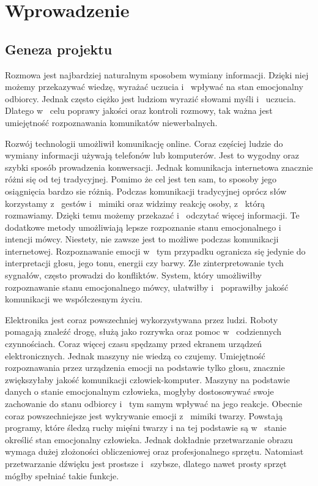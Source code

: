 \documentclass[declaration,shortabstract]{iithesis}
\author         {Elżbieta Plaszczyk}
\begin{document}
\let\cleardoublepage\clearpage
\chapter{Wprowadzenie}
\section{Geneza projektu}
Rozmowa jest najbardziej naturalnym sposobem wymiany informacji. Dzięki niej możemy przekazywać wiedzę, wyrażać uczucia i~ wpływać na stan emocjonalny odbiorcy.  Jednak często ciężko jest ludziom wyrazić słowami myśli i~ uczucia. Dlatego w~ celu poprawy jakości oraz kontroli rozmowy, tak ważna jest umiejętność rozpoznawania komunikatów niewerbalnych. 

Rozwój technologii umożliwił komunikację online. Coraz częściej ludzie do wymiany informacji używają telefonów lub komputerów. Jest to wygodny oraz szybki sposób prowadzenia konwersacji. Jednak komunikacja internetowa znacznie różni się od tej tradycyjnej. Pomimo że cel jest ten sam, to sposoby jego osiągnięcia bardzo sie różnią. Podczas komunikacji tradycyjnej oprócz słów korzystamy z~ gestów i~ mimiki oraz widzimy reakcję osoby, z~ którą rozmawiamy. Dzięki temu możemy przekazać i~ odczytać więcej informacji. Te dodatkowe metody umożliwiają lepsze rozpoznanie stanu emocjonalnego i~ intencji mówcy. Niestety, nie zawsze jest to możliwe podczas komunikacji internetowej. Rozpoznawanie emocji w~ tym przypadku ogranicza się jedynie do interpretacji głosu, jego tonu, energii czy barwy. Złe zinterpretowanie tych sygnałów, często prowadzi do konfliktów. System, który umożliwiłby rozpoznawanie stanu emocjonalnego mówcy, ułatwiłby i~ poprawiłby jakość komunikacji we współczesnym życiu. 

Elektronika jest coraz powszechniej wykorzystywana przez ludzi. Roboty pomagają znaleźć drogę, służą jako rozrywka oraz pomoc w~ codziennych czynnościach. Coraz więcej czasu spędzamy przed ekranem urządzeń elektronicznych. Jednak maszyny nie wiedzą co czujemy. Umiejętność rozpoznawania przez urządzenia emocji na podstawie tylko głosu, znacznie zwiększyłaby jakość komunikacji człowiek-komputer. Maszyny na podstawie danych o stanie emocjonalnym człowieka, mogłyby dostosowywać swoje zachowanie do stanu odbiorcy i~ tym samym wpływać na jego reakcje. Obecnie coraz powszechniejsze jest wykrywanie emocji z~ mimiki twarzy. Powstają programy, które śledzą ruchy mięśni twarzy i na tej podstawie są w~ stanie określić stan emocjonalny człowieka. Jednak dokładnie przetwarzanie obrazu wymaga dużej złożoności obliczeniowej oraz profesjonalnego sprzętu. Natomiast przetwarzanie dźwięku jest prostsze i~ szybsze, dlatego nawet prosty sprzęt mógłby spełniać takie funkcje.
\end{document}
